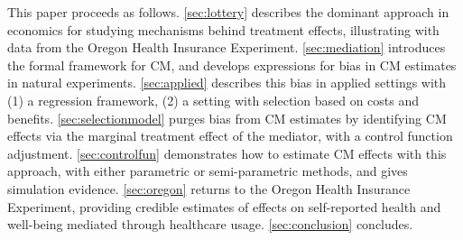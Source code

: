 This paper proceeds as follows.
\autoref{sec:lottery} describes the dominant approach in economics for studying mechanisms behind treatment effects, illustrating with data from the Oregon Health Insurance Experiment.
\autoref{sec:mediation} introduces the formal framework for CM, and develops expressions for bias in CM estimates in natural experiments.
\autoref{sec:applied} describes this bias in applied settings with (1) a regression framework, (2) a setting with selection based on costs and benefits.
\autoref{sec:selectionmodel} purges bias from CM estimates by identifying CM effects via the marginal treatment effect of the mediator, with a control function adjustment.
\autoref{sec:controlfun} demonstrates how to estimate CM effects with this approach, with either parametric or semi-parametric methods, and gives simulation evidence.
\autoref{sec:oregon} returns to the Oregon Health Insurance Experiment, providing credible estimates of effects on self-reported health and well-being mediated through healthcare usage.
\autoref{sec:conclusion} concludes.
